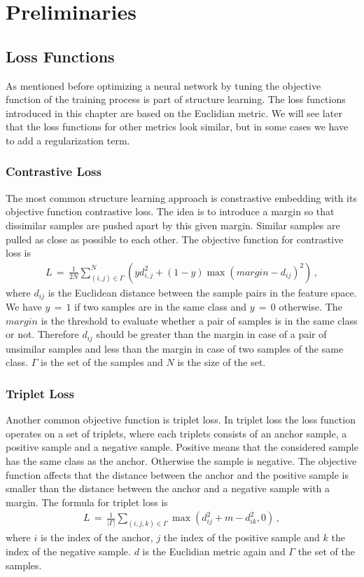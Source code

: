 \documentclass[12pt,paper=a4]{scrartcl}
\theoremstyle{break}
\begin{document}
\section{Preliminaries}
\subsection{Loss Functions}
As mentioned before optimizing a neural network by tuning the objective function of the training process is part of structure learning. The loss functions introduced in this chapter are based on the Euclidian metric. We will see later that the loss functions for other metrics look similar, but in some cases we have to add a regularization term.
\subsubsection{Contrastive Loss}
The most common structure learning approach is constrastive embedding with its objective function contrastive loss. The idea is to introduce a margin so that dissimilar samples are pushed apart by this given margin. Similar samples are pulled as close as possible to each other. The objective function for contrastive loss is
\begin{align}
L\, = \, \frac{1}{2N}\sum_{(i,j)\in \Gamma}^N\left( yd_{i,j}^2+\left( 1-y\right) \max \left( margin - d_{ij}\right)^2\right)\, ,
\end{align}
where $d_{ij}$ is the Euclidean distance between the sample pairs in the feature space. We have $y \, = \, 1$ if two samples are in the same class and $y \, = \, 0$ otherwise. The $margin$ is the threshold to evaluate whether a pair of samples is in the same class or not. Therefore $d_{ij}$ should be greater than the margin in case of a pair of unsimilar samples and less than the margin in case of two samples of the same class. $\Gamma$ is the set of the samples and $N$ is the size of the set.
\subsubsection{Triplet Loss}
Another common objective function is triplet loss. In triplet loss the loss function operates on a set of triplets, where each triplets consists of an anchor sample, a positive sample and a negative sample. Positive means that the considered sample has the same class as the anchor. Otherwise the sample is negative. The objective function affects that the distance between the anchor and the positive sample is smaller than the distance between the anchor and a negative sample with a margin. The formula for triplet loss is
\begin{align}
L \, = \, \frac{1}{|\Gamma|}\sum_{(i,j,k)\in \Gamma}\max (d_{ij}^2 + m - d_{ik}^2,0)\, ,
\end{align}
where $i$ is the index of the anchor, $j$ the index of the positive sample and $k$ the index of the negative sample. $d$ is the Euclidian metric again and $\Gamma$ the set of the samples.
\end{document}
